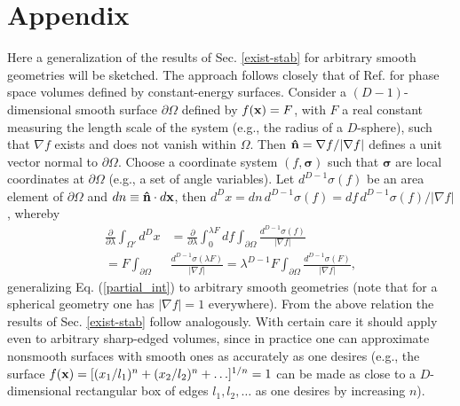 \documentclass[a4paper,prd,twocolumn,showpacs,amsmath]{revtex4}
\newcommand{\vecx}{{\bf x}}
\newcommand{\vecn}{{\bf \hat n}}
\newcommand{\vecsigma}{{\bm \sigma}}
\newcommand{\domega}{\partial \Omega}
\begin{document}
\section*{Appendix}
Here a generalization of the results of Sec. \ref{exist-stab} for arbitrary smooth geometries will be
sketched. The approach follows closely that of Ref. \cite{khinchin} for phase space
volumes defined by constant-energy surfaces.
Consider a $(D-1)$-dimensional smooth surface $\domega$ defined by $f(\vecx)=F$, with $F$ a
real constant measuring the length scale of the system (e.g., the radius of a $D$-sphere), such
that $\nabla f$ exists and does not vanish within $\Omega$. Then $\vecn=\nabla f/|\nabla f|$ defines a unit
vector normal to $\domega$. Choose a coordinate system $(f,\vecsigma)$ such that $\vecsigma$ are local
coordinates at $\domega$ (e.g., a set of angle variables). Let $d^{D-1}\sigma(f)$
be an area element of $\domega$ and $dn\equiv\vecn\cdot d\vecx$, then
$d^D x = dn\,d^{D-1}\sigma(f) = df\,d^{D-1}\sigma(f)/|\nabla f|$, whereby
\begin{align}
  \frac{\partial}{\partial \lambda} \int_{\Omega'} d^D x & =
    \frac{\partial}{\partial \lambda} \int_0^{\lambda F} df \int_{\domega} \frac{d^{D-1}\sigma(f)}{|\nabla f|} \nonumber \\
   = F \int_{\domega} &\frac{d^{D-1}\sigma(\lambda F)}{|\nabla f|} = \lambda^{D-1} F \int_{\domega} \frac{d^{D-1}\sigma(F)}{|\nabla f|},
\end{align}
generalizing Eq. (\ref{partial_int}) to arbitrary smooth geometries (note that for a spherical geometry
one has $|\nabla f| = 1$ everywhere). From the above relation the results of Sec. \ref{exist-stab} follow
analogously. With certain care it should apply even to arbitrary sharp-edged volumes, since
in practice one can approximate nonsmooth surfaces with smooth ones as accurately as one desires
(e.g., the surface $f(\vecx)=[(x_1/l_1)^n + (x_2/l_2)^n + \ldots]^{1/n}=1$ can be made as close to
a $D$-dimensional rectangular box of edges $l_1,l_2,\ldots$ as one desires by increasing $n$).



\end{document}
